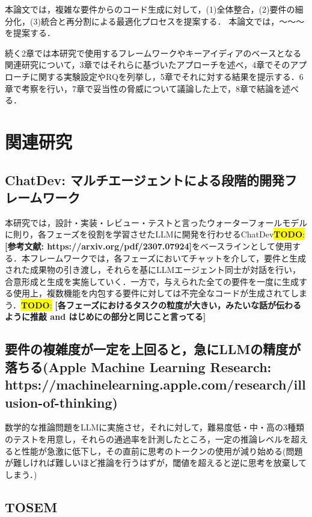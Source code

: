 \documentclass[submit,techrep,noauthor]{ipsj}
\newcommand{\todo}[1]{\colorbox{yellow}{{\bf TODO}:}{\color{red} {\textbf{[#1]}}}}
\begin{document}
本論文では，複雑な要件からのコード生成に対して，(1)全体整合，(2)要件の細分化，(3)統合と再分割による最適化プロセスを提案する．
本論文では，〜〜〜を提案する．

続く2章では本研究で使用するフレームワークやキーアイディアのベースとなる関連研究について，3章ではそれらに基づいたアプローチを述べ，4章でそのアプローチに関する実験設定やRQを列挙し，5章でそれに対する結果を提示する．6章で考察を行い，7章で妥当性の脅威について議論した上で，8章で結論を述べる．

\section{関連研究}
\label{sec:format}

\subsection{ChatDev: マルチエージェントによる段階的開発フレームワーク}
本研究では，設計・実装・レビュー・テストと言ったウォーターフォールモデルに則り，各フェーズを役割を学習させたLLMに開発を行わせるChatDev\todo{参考文献: https://arxiv.org/pdf/2307.07924}をベースラインとして使用する．本フレームワークでは，各フェーズにおいてチャットを介して，要件と生成された成果物の引き渡し，それらを基にLLMエージェント同士が対話を行い，合意形成と生成を実施していく．一方で，与えられた全ての要件を一度に生成する使用上，複数機能を内包する要件に対しては不完全なコードが生成されてしまう．\todo{各フェーズにおけるタスクの粒度が大きい，みたいな話が伝わるように推敲 and はじめにの部分と同じこと言ってる}


\subsection{要件の複雑度が一定を上回ると，急にLLMの精度が落ちる(Apple Machine Learning Research: https://machinelearning.apple.com/research/illusion-of-thinking)}

数学的な推論問題をLLMに実施させ，それに対して，難易度低・中・高の3種類のテストを用意し，それらの通過率を計測したところ，一定の推論レベルを超えると性能が急激に低下し，その直前に思考のトークンの使用が減り始める(問題が難しければ難しいほど推論を行うはずが，閾値を超えると逆に思考を放棄してしまう．)


\subsection{TOSEM}



\end{document}
